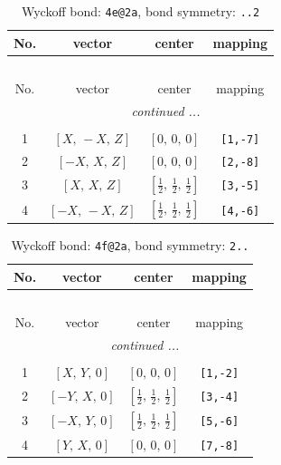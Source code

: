 \documentclass[fleqn,8pt]{jsarticle}
\begin{document}
\renewcommand{\arraystretch}{1.2}
\begin{longtable}{cccc}
\caption{Wyckoff bond: {\tt 4e@2a}, bond symmetry: {\tt ..2}}
 \\
 \hline \hline
No. & vector & center & mapping \\ \hline \endfirsthead

\multicolumn{3}{l}{\tablename\ \thetable{}} \\
 \hline \hline
No. & vector & center & mapping \\ \hline \endhead

 \hline \hline
\multicolumn{3}{r}{\footnotesize\it continued ...} \\ \endfoot

 \hline \hline
\multicolumn{3}{r}{} \\ \endlastfoot

1 & $\left[ X,\, - X,\, Z \right]$ & $\left[ 0,\, 0,\, 0 \right]$ & {\tt [1,-7]} \\ \hline
2 & $\left[ - X,\, X,\, Z \right]$ & $\left[ 0,\, 0,\, 0 \right]$ & {\tt [2,-8]} \\ \hline
3 & $\left[ X,\, X,\, Z \right]$ & $\left[ \frac{1}{2},\, \frac{1}{2},\, \frac{1}{2} \right]$ & {\tt [3,-5]} \\ \hline
4 & $\left[ - X,\, - X,\, Z \right]$ & $\left[ \frac{1}{2},\, \frac{1}{2},\, \frac{1}{2} \right]$ & {\tt [4,-6]} \\
\end{longtable}
\renewcommand{\arraystretch}{1.2}
\begin{longtable}{cccc}
\caption{Wyckoff bond: {\tt 4f@2a}, bond symmetry: {\tt 2..}}
 \\
 \hline \hline
No. & vector & center & mapping \\ \hline \endfirsthead

\multicolumn{3}{l}{\tablename\ \thetable{}} \\
 \hline \hline
No. & vector & center & mapping \\ \hline \endhead

 \hline \hline
\multicolumn{3}{r}{\footnotesize\it continued ...} \\ \endfoot

 \hline \hline
\multicolumn{3}{r}{} \\ \endlastfoot

1 & $\left[ X,\, Y,\, 0 \right]$ & $\left[ 0,\, 0,\, 0 \right]$ & {\tt [1,-2]} \\ \hline
2 & $\left[ - Y,\, X,\, 0 \right]$ & $\left[ \frac{1}{2},\, \frac{1}{2},\, \frac{1}{2} \right]$ & {\tt [3,-4]} \\ \hline
3 & $\left[ - X,\, Y,\, 0 \right]$ & $\left[ \frac{1}{2},\, \frac{1}{2},\, \frac{1}{2} \right]$ & {\tt [5,-6]} \\ \hline
4 & $\left[ Y,\, X,\, 0 \right]$ & $\left[ 0,\, 0,\, 0 \right]$ & {\tt [7,-8]} \\
\end{longtable}
\end{document}
